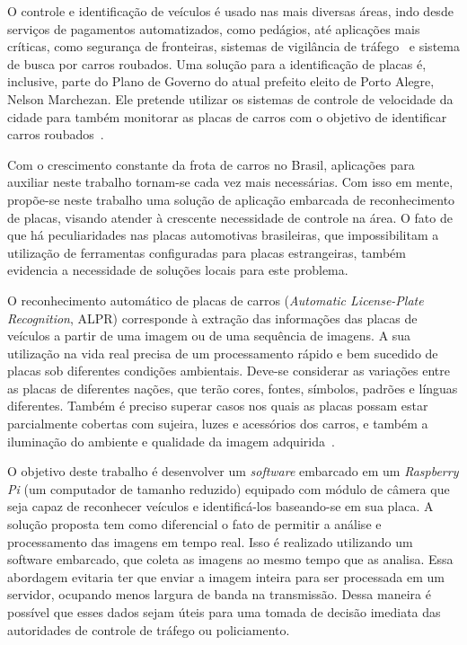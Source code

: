 O controle e identificação de veículos é usado nas mais diversas áreas, indo
desde serviços de pagamentos automatizados, como pedágios, até aplicações mais
críticas, como segurança de fronteiras, sistemas de vigilância de
tráfego~\cite{ahmad2015automatic} e sistema de busca por carros roubados.
Uma solução para a identificação de placas é, inclusive,  parte do Plano de Governo do atual prefeito eleito de Porto Alegre,
Nelson Marchezan. Ele pretende utilizar os sistemas de controle de velocidade da cidade para também
monitorar as placas de carros com o objetivo de identificar carros roubados~\cite{psdb2016marchezan}.

Com o crescimento constante da frota de carros no Brasil, aplicações para
auxiliar neste trabalho tornam-se cada vez
mais necessárias. Com isso em mente, propõe-se neste trabalho uma
solução de aplicação embarcada de reconhecimento de placas, visando
atender à crescente necessidade de controle na área. O fato de que há
peculiaridades nas placas automotivas
brasileiras, que impossibilitam a utilização de ferramentas configuradas
para placas estrangeiras, também evidencia a necessidade de soluções
locais para este problema.

O reconhecimento automático de placas de carros (\emph{Automatic License-Plate
Recognition}, ALPR) corresponde à extração
das informações das placas de veículos a partir
de uma imagem ou de uma sequência de imagens. A sua utilização na vida real
precisa de um processamento rápido e bem sucedido de placas sob diferentes
condições ambientais. Deve-se considerar as variações entre as placas de
diferentes nações, que terão cores, fontes, símbolos, padrões e línguas
diferentes. Também é preciso superar casos nos quais as placas possam estar
parcialmente cobertas com sujeira, luzes e acessórios dos
carros, e também a iluminação do ambiente e qualidade
da imagem adquirida~\cite{s2013automatic}.

O objetivo deste trabalho é desenvolver um \emph{software} embarcado em um \emph{Raspberry Pi}
(um computador de tamanho reduzido) equipado com módulo de câmera que seja
capaz de reconhecer veículos e identificá-los baseando-se em sua
placa. A solução proposta tem como diferencial o fato de permitir a
análise e processamento das imagens em tempo real. Isso é realizado utilizando um software embarcado, que coleta as imagens ao mesmo tempo
que as analisa. Essa abordagem evitaria ter que enviar a imagem inteira para ser processada em um servidor, ocupando menos largura de banda na transmissão. Dessa maneira é possível que esses dados sejam úteis para uma tomada de decisão imediata das autoridades de controle de tráfego ou policiamento.

